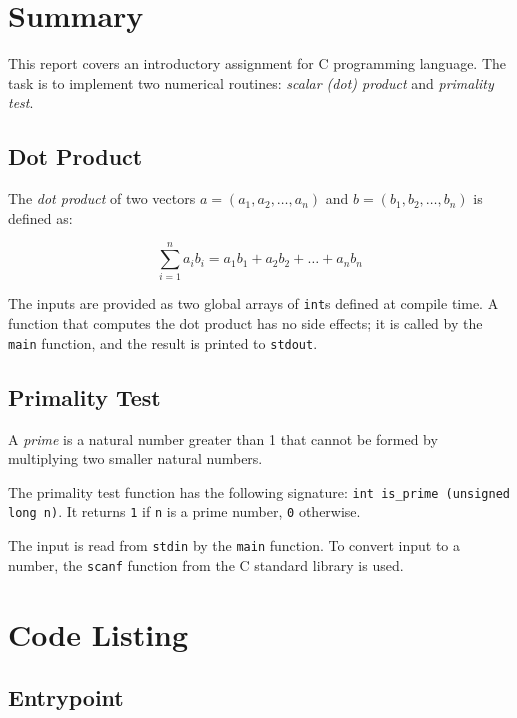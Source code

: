 \documentclass[en, listings]{labreport}
\begin{document}
\maketitlepage

\section*{Summary}

This report covers an introductory assignment for C programming language. The
task is to implement two numerical routines: \textit{scalar (dot) product} and
\textit{primality test}.

\subsection*{Dot Product}

The \textit{dot product} of two vectors $a = (a_1, a_2, \dots, a_n)$
and $b = (b_1, b_2, \dots, b_n)$ is defined as:

$$\sum_{i = 1}^n a_i b_i = a_1 b_1 + a_2 b_2 + \dots + a_n b_n$$

The inputs are provided as two global arrays of \texttt{int}s defined
at compile time. A function that computes the dot product has no
side effects; it is called by the \texttt{main} function, and the result is
printed to \texttt{stdout}.

\subsection*{Primality Test}

A \textit{prime} is a natural number greater than 1 that cannot be formed
by multiplying two smaller natural numbers.

The primality test function has the following signature:
\texttt{int is\_prime (unsigned long n)}. It returns \texttt{1}
if \texttt{n} is a prime number, \texttt{0} otherwise.

The input is read from \texttt{stdin} by the \texttt{main} function.
To convert input to a number, the \texttt{scanf} function from the
C standard library is used.

\section*{Code Listing}

\subsection*{Entrypoint}


\end{document}
